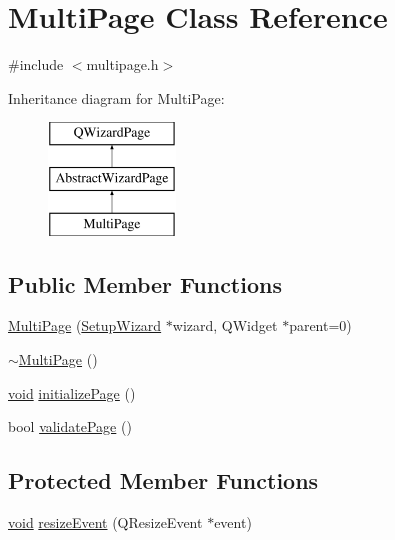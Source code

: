 \hypertarget{class_multi_page}{\section{Multi\-Page Class Reference}
\label{class_multi_page}
}


{\ttfamily \#include $<$multipage.\-h$>$}

Inheritance diagram for Multi\-Page\-:\begin{figure}[H]
\begin{center}
\leavevmode
\includegraphics[height=3.000000cm]{class_multi_page}
\end{center}
\end{figure}
\subsection*{Public Member Functions}
\begin{DoxyCompactItemize}
\item 
\hyperlink{group___multi_page_ga67a3b947f1068a2da86e80b181056859}{Multi\-Page} (\hyperlink{class_setup_wizard}{Setup\-Wizard} $\ast$wizard, Q\-Widget $\ast$parent=0)
\item 
\hyperlink{group___multi_page_ga6823cea164d1876265dc9606cc878278}{$\sim$\-Multi\-Page} ()
\item 
\hyperlink{group___u_a_v_objects_plugin_ga444cf2ff3f0ecbe028adce838d373f5c}{void} \hyperlink{group___multi_page_gae0380b77afc297043f95c8807031e3dc}{initialize\-Page} ()
\item 
bool \hyperlink{group___multi_page_ga07b9bef6a8d037baebbb6ca9470c6a48}{validate\-Page} ()
\end{DoxyCompactItemize}
\subsection*{Protected Member Functions}
\begin{DoxyCompactItemize}
\item 
\hyperlink{group___u_a_v_objects_plugin_ga444cf2ff3f0ecbe028adce838d373f5c}{void} \hyperlink{group___multi_page_ga29d29742f1cbfe57833315d3d48f9215}{resize\-Event} (Q\-Resize\-Event $\ast$event)
\end{DoxyCompactItemize}



